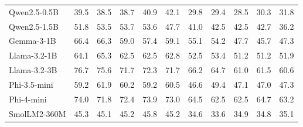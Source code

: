 \documentclass[letterpaper]{article}
\begin{document}
\begin{table}[t]
{\begin{tabular}{lccccc|ccccc}
Qwen2.5-0.5B & \cellcolor[HTML]{F8DACC}39.5 & \cellcolor[HTML]{F8D9CC}38.5 & \cellcolor[HTML]{FADFCC}38.7 & \cellcolor[HTML]{FBE4CC}40.9 & \cellcolor[HTML]{FBE5CC}42.1 & \cellcolor[HTML]{F8D9CC}29.8 & \cellcolor[HTML]{F8DACC}29.4 & \cellcolor[HTML]{F9DCCC}28.5 & \cellcolor[HTML]{FAE2CC}30.3 & \cellcolor[HTML]{FBE4CC}31.8 \\
Qwen2.5-1.5B & \cellcolor[HTML]{FDECCC}51.8 & \cellcolor[HTML]{FEF0CC}53.5 & \cellcolor[HTML]{FCF1CD}53.7 & \cellcolor[HTML]{FAF1CD}53.6 & \cellcolor[HTML]{FEEDCC}47.7 & \cellcolor[HTML]{FDEACC}41.0 & \cellcolor[HTML]{FEEECC}42.5 & \cellcolor[HTML]{FFF2CC}42.5 & \cellcolor[HTML]{FCF1CD}42.7 & \cellcolor[HTML]{FDEBCC}36.2 \\
Gemma-3-1B & \cellcolor[HTML]{EFEFCF}66.4 & \cellcolor[HTML]{EDEECF}66.3 & \cellcolor[HTML]{F4F0CE}59.0 & \cellcolor[HTML]{F4F0CE}57.4 & \cellcolor[HTML]{F3EFCE}59.1 & \cellcolor[HTML]{F3EFCE}55.1 & \cellcolor[HTML]{F2EFCE}54.2 & \cellcolor[HTML]{F8F0CD}47.7 & \cellcolor[HTML]{F7F0CD}45.7 & \cellcolor[HTML]{F6F0CE}47.3 \\
Llama-3.2-1B & \cellcolor[HTML]{F3EFCE}64.1 & \cellcolor[HTML]{EFEFCF}65.3 & \cellcolor[HTML]{EFEFCF}62.5 & \cellcolor[HTML]{EDEECF}62.5 & \cellcolor[HTML]{EDEECF}62.8 & \cellcolor[HTML]{F6F0CE}52.5 & \cellcolor[HTML]{F3EFCE}53.4 & \cellcolor[HTML]{F2EFCE}51.2 & \cellcolor[HTML]{EFEFCF}51.2 & \cellcolor[HTML]{EFEFCF}51.9 \\
Llama-3.2-3B & \cellcolor[HTML]{E0EBD2}76.7 & \cellcolor[HTML]{DFEBD2}75.6 & \cellcolor[HTML]{E1ECD2}71.7 & \cellcolor[HTML]{DEEBD2}72.3 & \cellcolor[HTML]{E0EBD2}71.7 & \cellcolor[HTML]{E2ECD1}66.2 & \cellcolor[HTML]{E2ECD1}64.7 & \cellcolor[HTML]{E4ECD1}61.0 & \cellcolor[HTML]{DFEBD2}61.5 & \cellcolor[HTML]{E2ECD1}60.6 \\
Phi-3.5-mini & \cellcolor[HTML]{FAF1CD}59.2 & \cellcolor[HTML]{F4F0CE}61.9 & \cellcolor[HTML]{F2EFCE}60.2 & \cellcolor[HTML]{F2EFCE}59.2 & \cellcolor[HTML]{F1EFCF}60.5 & \cellcolor[HTML]{FFF2CC}46.6 & \cellcolor[HTML]{F9F1CD}49.4 & \cellcolor[HTML]{F9F1CD}47.1 & \cellcolor[HTML]{F5F0CE}47.0 & \cellcolor[HTML]{F6F0CE}47.3 \\
Phi-4-mini & \cellcolor[HTML]{E4ECD1}74.0 & \cellcolor[HTML]{E5EDD1}71.8 & \cellcolor[HTML]{E0EBD2}72.4 & \cellcolor[HTML]{DCEBD2}73.9 & \cellcolor[HTML]{DEEBD2}73.0 & \cellcolor[HTML]{E5ECD1}64.5 & \cellcolor[HTML]{E5EDD1}62.5 & \cellcolor[HTML]{E1ECD1}62.5 & \cellcolor[HTML]{DAEAD3}64.7 & \cellcolor[HTML]{DEEBD2}63.2 \\
SmolLM2-360M & \cellcolor[HTML]{FAE2CC}45.3 & \cellcolor[HTML]{FBE3CC}45.1 & \cellcolor[HTML]{FCE9CC}45.2 & \cellcolor[HTML]{FDEBCC}45.8 & \cellcolor[HTML]{FDE9CC}45.2 & \cellcolor[HTML]{FAE0CC}34.6 & \cellcolor[HTML]{FAE0CC}33.6 & \cellcolor[HTML]{FCE6CC}34.9 & \cellcolor[HTML]{FCE9CC}34.8 & \cellcolor[HTML]{FCE9CC}35.1 \\

\end{tabular}}
\end{table}
\end{document}
